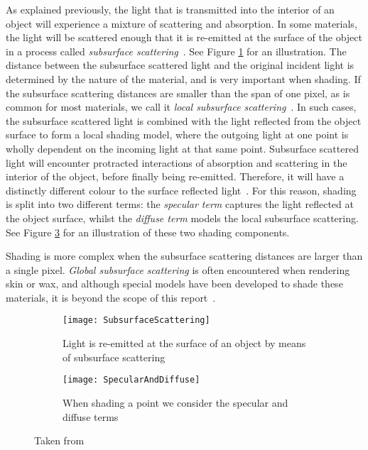 As explained previously, the light that is transmitted into the interior of an object will experience a mixture of scattering and absorption. In some materials, the light will be scattered enough that it is re-emitted at the surface of the object in a process called \textit{subsurface scattering}~\cite{Spectroscopy}. See Figure \ref{fig:SubsurfaceScattering} for an illustration. The distance between the subsurface scattered light and the original incident light is determined by the nature of the material, and is very important when shading. If the subsurface scattering distances are smaller than the span of one pixel, as is common for most materials, we call it \textit{local subsurface scattering}~\cite{PractitionersReflectionModels}. In such cases, the subsurface scattered light is combined with the light reflected from the object surface to form a local shading model, where the outgoing light at one point is wholly dependent on the incoming light at that same point. Subsurface scattered light will encounter protracted interactions of absorption and scattering in the interior of the object, before finally being re-emitted. Therefore, it will have a distinctly different colour to the surface reflected light~\cite{ReflectionFromLayeredSurfaces}. For this reason, shading is split into two different terms: the \textit{specular term} captures the light reflected at the object surface, whilst the \textit{diffuse term} models the local subsurface scattering. See Figure \ref{fig:SpecularAndDiffuse} for an illustration of these two shading components.

Shading is more complex when the subsurface scattering distances are larger than a single pixel. \textit{Global subsurface scattering} is often encountered when rendering skin or wax, and although special models have been developed to shade these materials, it is beyond the scope of this report~\cite{SeparableSubsurfaceScattering}.

\begin{figure}[h]
	\begin{subfigure}{0.48\textwidth}
		\texttt{[image: SubsurfaceScattering]}
		\caption{Light is re-emitted at the surface of an object by means of subsurface scattering}
		\label{fig:SubsurfaceScattering}
	\end{subfigure}
	\hspace*{\fill}
	\begin{subfigure}{0.48\textwidth}
		\texttt{[image: SpecularAndDiffuse]}
		\caption{When shading a point we consider the specular and diffuse terms}
		\label{fig:SpecularAndDiffuse}
	\end{subfigure}
	\caption{Taken from~\cite{RTR4}}
\end{figure}

